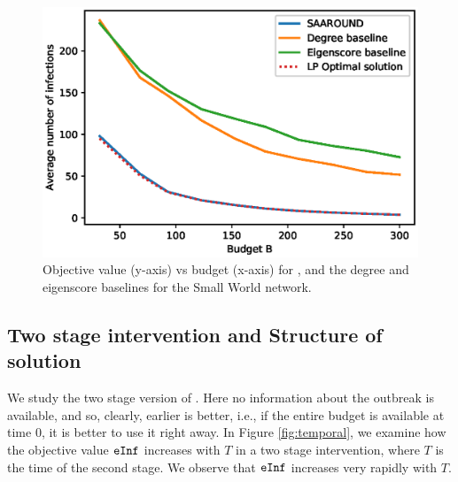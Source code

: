 \begin{figure}[!h]
    \centering
    \includegraphics[scale = 0.6]{Figuresnew/smallworld_approx}
    \caption{Objective value (y-axis) vs budget (x-axis) for \algo{}, and the degree and eigenscore baselines for the Small World network.}
    \label{fig:mont-approx}
\end{figure}

\subsection{Two stage intervention and Structure of solution}
We study the two stage version of \prob{}. Here no information about the outbreak is available, and so, clearly, earlier is better, i.e., if the entire budget is available at time $0$, it is better to use it right away. In Figure \ref{fig:temporal}, we examine how the objective value $\texttt{eInf}{}$ increases with $T$ in a two stage intervention, where $T$ is the time of the second stage. We observe that $\texttt{eInf}{}$ increases very rapidly with $T$.

